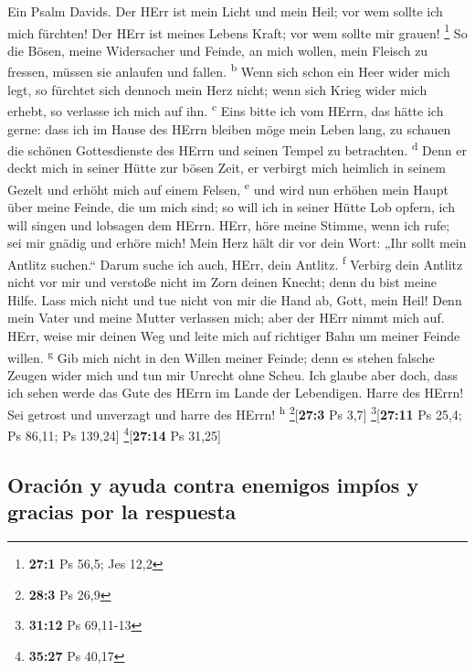  Ein Psalm Davids. Der HErr ist mein Licht und mein Heil;
vor wem sollte ich mich fürchten! Der HErr ist meines Lebens Kraft; vor
wem sollte mir grauen! \footnote{\textbf{27:1} Ps 56,5; Jes 12,2}
 So die Bösen, meine Widersacher und Feinde, an mich
wollen, mein Fleisch zu fressen, müssen sie anlaufen und fallen.
\textsuperscript{b}  Wenn sich schon ein Heer wider mich
legt, so fürchtet sich dennoch mein Herz nicht; wenn sich Krieg wider
mich erhebt, so verlasse ich mich auf ihn. \textsuperscript{c}
 Eins bitte ich vom HErrn, das hätte ich gerne: dass ich
im Hause des HErrn bleiben möge mein Leben lang, zu schauen die schönen
Gottesdienste des HErrn und seinen Tempel zu betrachten.
\textsuperscript{d}  Denn er deckt mich in seiner Hütte
zur bösen Zeit, er verbirgt mich heimlich in seinem Gezelt und erhöht
mich auf einem Felsen, \textsuperscript{e}  und wird nun
erhöhen mein Haupt über meine Feinde, die um mich sind; so will ich in
seiner Hütte Lob opfern, ich will singen und lobsagen dem HErrn.
 HErr, höre meine Stimme, wenn ich rufe; sei mir gnädig
und erhöre mich!  Mein Herz hält dir vor dein Wort: „Ihr
sollt mein Antlitz suchen.`` Darum suche ich auch, HErr, dein Antlitz.
\textsuperscript{f}  Verbirg dein Antlitz nicht vor mir
und verstoße nicht im Zorn deinen Knecht; denn du bist meine Hilfe. Lass
mich nicht und tue nicht von mir die Hand ab, Gott, mein Heil!
 Denn mein Vater und meine Mutter verlassen mich; aber
der HErr nimmt mich auf.  HErr, weise mir deinen Weg und
leite mich auf richtiger Bahn um meiner Feinde willen.
\textsuperscript{g}  Gib mich nicht in den Willen meiner
Feinde; denn es stehen falsche Zeugen wider mich und tun mir Unrecht
ohne Scheu.  Ich glaube aber doch, dass ich sehen werde
das Gute des HErrn im Lande der Lebendigen.  Harre des
HErrn! Sei getrost und unverzagt und harre des HErrn!
\textsuperscript{h} \footnote{\textbf{28:3} Ps 26,9}{[}\textbf{27:3} Ps
3,7{]} \footnote{\textbf{31:12} Ps 69,11-13}{[}\textbf{27:11} Ps 25,4;
Ps 86,11; Ps 139,24{]} \footnote{\textbf{35:27} Ps 40,17}{[}\textbf{27:14}
Ps 31,25{]}

\hypertarget{oraciuxf3n-y-ayuda-contra-enemigos-impuxedos-y-gracias-por-la-respuesta}{%
\subsection{Oración y ayuda contra enemigos impíos y gracias por la
respuesta}\label{oraciuxf3n-y-ayuda-contra-enemigos-impuxedos-y-gracias-por-la-respuesta}}

